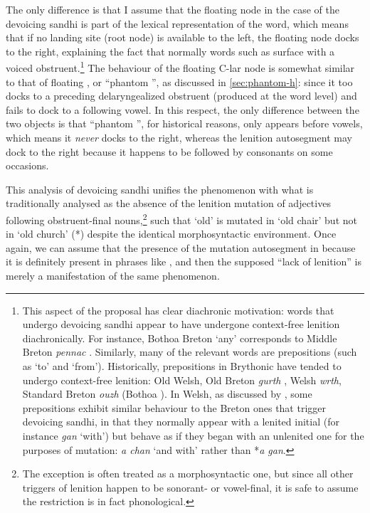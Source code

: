 The only difference is that I assume that the floating node in the case of the devoicing sandhi is part of the lexical representation of the word, which means that if no landing site (\ie root node) is available to the left, the floating node docks to the right, explaining the fact that normally words such as \ipa{[ɡand̥]} surface with a voiced obstruent.\footnote{This aspect of the proposal has clear diachronic motivation: words that undergo devoicing sandhi appear to have undergone context-free lenition diachronically. For instance, Bothoa Breton \ipa{[bəˈnakəd̥]} `any' corresponds to Middle Breton \emph{pennac} \citep{LlydawegCanol,schrijver11:_middl_early_moder_breton}. Similarly, many of the relevant words are prepositions (such as \ipa{[də]} `to' and \ipa{[dəz]} `from'). Historically, prepositions in Brythonic have tended to undergo context-free lenition: Old Welsh, Old Breton \emph{gurth} \citep{fleuriot64:_le,falileyev07:_le}, Welsh \emph{wrth}, Standard Breton \emph{ouzh} (Bothoa \ipa{[oh]}). In Welsh, as discussed by \citet{morgan,miw}, some prepositions exhibit similar behaviour to the Breton ones that trigger devoicing sandhi, in that they normally appear with a lenited initial (for instance \emph{gan} `with') but behave as if they began with an unlenited one for the purposes of mutation: \emph{a chan} `and with' rather than *\emph{a gan}.} The behaviour of the floating C-lar node is somewhat similar to that of floating , or \enquote{phantom \ipa{[h]}}, as discussed in \cref{sec:phantom-h}: since it too docks to a preceding delaryngealized obstruent (produced at the word level) and fails to dock to a following vowel. In this respect, the only difference between the two objects is that \enquote{phantom \ipa{[h]}}, for historical reasons, only appears before vowels, which means it \emph{never} docks to the right, whereas the lenition autosegment may dock to the right because it happens to be followed by consonants on some occasions.

This analysis of devoicing sandhi unifies the phenomenon with what is traditionally analysed as the absence of the lenition mutation of adjectives following obstruent-final nouns,\footnote{The exception is often treated as a morphosyntactic one, but since all other triggers of lenition happen to be sonorant- or vowel-final, it is safe to assume the restriction is in fact phonological.} such that  `old' is mutated in  `old chair' but not in  `old church' (*) despite the identical morphosyntactic environment. Once again, we can assume that the presence of the mutation autosegment in  because it is definitely present in phrases like , and then the supposed \enquote{lack of lenition} is merely a manifestation of the same phenomenon.

